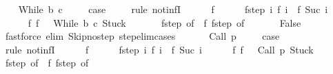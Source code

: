 \begin{isabellebody}
\isanewline
{}\isamarkupfalse%
\isanewline
\ \ \isamarkupfalse%
\ {\isacharparenleft}While\ b\ c{\isacharparenright}\ \isanewline
\ \ \isamarkupfalse%
\ {\isacharquery}case\ \isanewline
\ \ \isamarkupfalse%
\ {\isacharparenleft}rule\ not{\isacharunderscore}infI{\isacharparenright}\isanewline
\ \ \ \ \isamarkupfalse%
\ f\isanewline
\ \ \ \ \isamarkupfalse%
\ f{\isacharunderscore}step{\isacharcolon}\ {\isachardoublequoteopen}{\isasymAnd}i{\isachardot}\ {\isasymGamma}{\isasymturnstile}f\ i\ {\isasymrightarrow}\ f\ {\isacharparenleft}Suc\ i{\isacharparenright}{\isachardoublequoteclose}\isanewline
\ \ \ \ \isamarkupfalse%
\ f{\isacharunderscore}{}{\isacharcolon}\ {\isachardoublequoteopen}f\ {}\ {\isacharequal}\ {\isacharparenleft}While\ b\ c{\isacharcomma}\ Stuck{\isacharparenright}{\isachardoublequoteclose}\ \isanewline
\ \ \ \ \isamarkupfalse%
\ f{\isacharunderscore}step\ {\isacharbrackleft}of\ {}{\isacharbrackright}\ f{\isacharunderscore}{}\ f{\isacharunderscore}step\ {\isacharbrackleft}of\ {}{\isacharbrackright}\isanewline
\ \ \ \ \isamarkupfalse%
\ False\isanewline
\ \ \ \ \ \ \isamarkupfalse%
\ {\isacharparenleft}fastforce\ elim{\isacharcolon}\ Skip{\isacharunderscore}no{\isacharunderscore}step\ step{\isacharunderscore}elim{\isacharunderscore}cases{\isacharparenright}\isanewline
\ \ \isamarkupfalse%
\isanewline
{}\isamarkupfalse%
\isanewline
\ \ \isamarkupfalse%
\ {\isacharparenleft}Call\ p{\isacharparenright}\ \isanewline
\ \ \isamarkupfalse%
\ {\isacharquery}case\ \isanewline
\ \ \isamarkupfalse%
\ {\isacharparenleft}rule\ not{\isacharunderscore}infI{\isacharparenright}\isanewline
\ \ \ \ \isamarkupfalse%
\ f\isanewline
\ \ \ \ \isamarkupfalse%
\ f{\isacharunderscore}step{\isacharcolon}\ {\isachardoublequoteopen}{\isasymAnd}i{\isachardot}\ {\isasymGamma}{\isasymturnstile}f\ i\ {\isasymrightarrow}\ f\ {\isacharparenleft}Suc\ i{\isacharparenright}{\isachardoublequoteclose}\isanewline
\ \ \ \ \isamarkupfalse%
\ f{\isacharunderscore}{}{\isacharcolon}\ {\isachardoublequoteopen}f\ {}\ {\isacharequal}\ {\isacharparenleft}Call\ p{\isacharcomma}\ Stuck{\isacharparenright}{\isachardoublequoteclose}\ \isanewline
\ \ \ \ \isamarkupfalse%
\ f{\isacharunderscore}step\ {\isacharbrackleft}of\ {}{\isacharbrackright}\ f{\isacharunderscore}{}\ f{\isacharunderscore}step\ {\isacharbrackleft}of\ {}{\isacharbrackright}\isanewline

\end{isabellebody}
